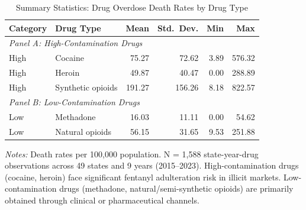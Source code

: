 \begin{table}[H]
\centering
\caption{Summary Statistics: Drug Overdose Death Rates by Drug Type}
\label{tab:summary}
\begin{threeparttable}
\begin{tabular}{llrrrr}
\toprule
Category & Drug Type & Mean & Std.\ Dev. & Min & Max \\
\midrule
\multicolumn{6}{l}{\textit{Panel A: High-Contamination Drugs}} \\
High & Cocaine & 75.27 & 72.62 & 3.89 & 576.32 \\
High & Heroin & 49.87 & 40.47 & 0.00 & 288.89 \\
High & Synthetic opioids & 191.27 & 156.26 & 8.18 & 822.57 \\
\midrule
\multicolumn{6}{l}{\textit{Panel B: Low-Contamination Drugs}} \\
Low & Methadone & 16.03 & 11.11 & 0.00 & 54.62 \\
Low & Natural opioids & 56.15 & 31.65 & 9.53 & 251.88 \\
\bottomrule
\end{tabular}
\begin{tablenotes}[flushleft]
\small
\item \textit{Notes:} Death rates per 100,000 population. N = 1,588 state-year-drug observations across 49 states and 9 years (2015--2023). High-contamination drugs (cocaine, heroin) face significant fentanyl adulteration risk in illicit markets. Low-contamination drugs (methadone, natural/semi-synthetic opioids) are primarily obtained through clinical or pharmaceutical channels.
\end{tablenotes}
\end{threeparttable}
\end{table}

